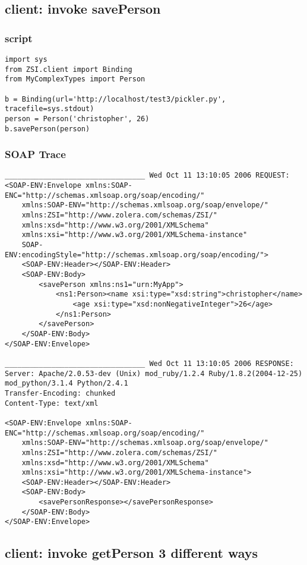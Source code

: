 \subsection{client: invoke savePerson}
\subsubsection{script}
\begin{verbatim}
import sys
from ZSI.client import Binding
from MyComplexTypes import Person

b = Binding(url='http://localhost/test3/pickler.py', tracefile=sys.stdout)
person = Person('christopher', 26)
b.savePerson(person)
\end{verbatim}

\subsubsection{SOAP Trace}
\begin{verbatim}
_________________________________ Wed Oct 11 13:10:05 2006 REQUEST:
<SOAP-ENV:Envelope xmlns:SOAP-ENC="http://schemas.xmlsoap.org/soap/encoding/"
	xmlns:SOAP-ENV="http://schemas.xmlsoap.org/soap/envelope/"
	xmlns:ZSI="http://www.zolera.com/schemas/ZSI/"
	xmlns:xsd="http://www.w3.org/2001/XMLSchema"
	xmlns:xsi="http://www.w3.org/2001/XMLSchema-instance"
	SOAP-ENV:encodingStyle="http://schemas.xmlsoap.org/soap/encoding/">
	<SOAP-ENV:Header></SOAP-ENV:Header>
	<SOAP-ENV:Body>
		<savePerson xmlns:ns1="urn:MyApp">
			<ns1:Person><name xsi:type="xsd:string">christopher</name>
				<age xsi:type="xsd:nonNegativeInteger">26</age>
			</ns1:Person>
		</savePerson>
	</SOAP-ENV:Body>
</SOAP-ENV:Envelope>

_________________________________ Wed Oct 11 13:10:05 2006 RESPONSE:
Server: Apache/2.0.53-dev (Unix) mod_ruby/1.2.4 Ruby/1.8.2(2004-12-25)
mod_python/3.1.4 Python/2.4.1
Transfer-Encoding: chunked
Content-Type: text/xml

<SOAP-ENV:Envelope xmlns:SOAP-ENC="http://schemas.xmlsoap.org/soap/encoding/"
	xmlns:SOAP-ENV="http://schemas.xmlsoap.org/soap/envelope/"
	xmlns:ZSI="http://www.zolera.com/schemas/ZSI/"
	xmlns:xsd="http://www.w3.org/2001/XMLSchema"
	xmlns:xsi="http://www.w3.org/2001/XMLSchema-instance">
	<SOAP-ENV:Header></SOAP-ENV:Header>
	<SOAP-ENV:Body>
		<savePersonResponse></savePersonResponse>
	</SOAP-ENV:Body>
</SOAP-ENV:Envelope>

\end{verbatim}

\subsection{client: invoke getPerson 3 different ways}

